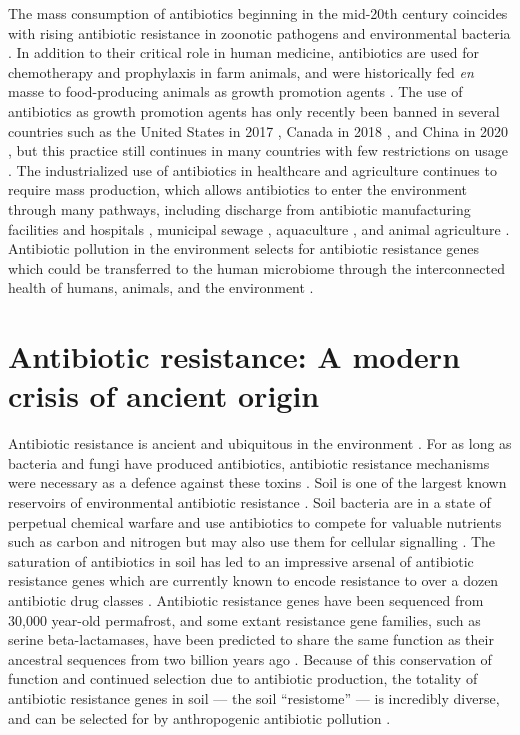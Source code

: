 The mass consumption of antibiotics beginning in the mid-20th century coincides with rising antibiotic resistance in zoonotic pathogens \parencite{Kirchhelle.2018, Ventola.2015} and environmental bacteria \parencite{Madueno.2018}.
In addition to their critical role in human medicine, antibiotics are used for chemotherapy and prophylaxis in farm animals, and were historically fed \textit{en} masse to food-producing animals as growth promotion agents \parencite{Kirchhelle.2018, Witte.1998}.
The use of antibiotics as growth promotion agents has only recently been banned in several countries such as the United States in 2017 \parencite{Scott.2019}, Canada in 2018 \parencite{Finlay.2019}, and China in 2020 \parencite{Hu.2020}, but this practice still continues in many countries with few restrictions on usage \parencite{Chuanchuen.2014}.
The industrialized use of antibiotics in healthcare and agriculture continues to require mass production, which allows antibiotics to enter the environment through many pathways, including discharge from antibiotic manufacturing facilities and hospitals \parencite{Marathe.2019, Bielen.2017}, municipal sewage \parencite{Parnanen.2019}, aquaculture \parencite{Reverter.2020}, and animal agriculture \parencite{Kirchhelle.2018}.
Antibiotic pollution in the environment selects for antibiotic resistance genes \parencite{Lau.2020, Jechalke.2014, Bielen.2017, Yi.2019} which could be transferred to the human microbiome through the interconnected health of humans, animals, and the environment \parencite{Berendonk.2015, HernandoAmado.2019, Tiedje.2019, Robinson.2016}.

\section{Antibiotic resistance: A modern crisis of ancient origin}

Antibiotic resistance is ancient and ubiquitous in the environment \parencite{DCosta.2011, Dunivin.2019}.
For as long as bacteria and fungi have produced antibiotics, antibiotic resistance mechanisms were necessary as a defence against these toxins \parencite{Cundliffe.1989}.
Soil is one of the largest known reservoirs of environmental antibiotic resistance \parencite{Dunivin.2019}.
Soil bacteria are in a state of perpetual chemical warfare and use antibiotics to compete for valuable nutrients such as carbon and nitrogen but may also use them for cellular signalling \parencite{Traxler.2015, Fajardo.2008}.
The saturation of antibiotics in soil has led to an impressive arsenal of antibiotic resistance genes which are currently known to encode resistance to over a dozen antibiotic drug classes \parencite{Wright.2007, Dunivin.2019}.
Antibiotic resistance genes have been sequenced from 30,000 year-old permafrost, and some extant resistance gene families, such as serine beta-lactamases, have been predicted to share the same function as their ancestral sequences from two billion years ago \parencite{DCosta.2011, Hall.2004}.
Because of this conservation of function and continued selection due to antibiotic production, the totality of antibiotic resistance genes in soil --- the soil “resistome” --- is incredibly diverse, and can be selected for by anthropogenic antibiotic pollution \parencite{Lau.2020, Jechalke.2014}.

